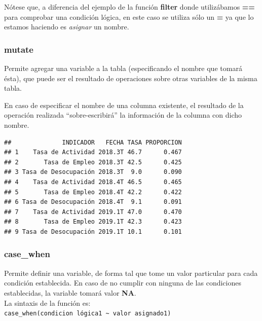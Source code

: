 \documentclass[]{book}
\newenvironment{Shaded}{\begin{snugshade}}{\end{snugshade}}
\newcommand{\DataTypeTok}[1]{\textcolor[rgb]{0.13,0.29,0.53}{#1}}
\newcommand{\DecValTok}[1]{\textcolor[rgb]{0.00,0.00,0.81}{#1}}
\newcommand{\KeywordTok}[1]{\textcolor[rgb]{0.13,0.29,0.53}{\textbf{#1}}}
\newcommand{\NormalTok}[1]{#1}
\newcommand{\OperatorTok}[1]{\textcolor[rgb]{0.81,0.36,0.00}{\textbf{#1}}}
\newcommand{\StringTok}[1]{\textcolor[rgb]{0.31,0.60,0.02}{#1}}
\begin{document}
Nótese que, a diferencia del ejemplo de la función \textbf{filter} donde utilizábamos \textbf{==} para comprobar una condición lógica, en este caso se utiliza sólo un \textbf{=} ya que lo estamos haciendo es \emph{asignar} un nombre.

\hypertarget{mutate}{%
\subsubsection{mutate}\label{mutate}}

Permite agregar una variable a la tabla (especificando el nombre que tomará ésta), que puede ser el resultado de operaciones sobre otras variables de la misma tabla.

En caso de especificar el nombre de una columna existente, el resultado de la operación realizada ``sobre-escribirá'' la información de la columna con dicho nombre.

\begin{Shaded}
\end{Shaded}

\begin{verbatim}
##              INDICADOR   FECHA TASA PROPORCION
## 1    Tasa de Actividad 2018.3T 46.7      0.467
## 2       Tasa de Empleo 2018.3T 42.5      0.425
## 3 Tasa de Desocupación 2018.3T  9.0      0.090
## 4    Tasa de Actividad 2018.4T 46.5      0.465
## 5       Tasa de Empleo 2018.4T 42.2      0.422
## 6 Tasa de Desocupación 2018.4T  9.1      0.091
## 7    Tasa de Actividad 2019.1T 47.0      0.470
## 8       Tasa de Empleo 2019.1T 42.3      0.423
## 9 Tasa de Desocupación 2019.1T 10.1      0.101
\end{verbatim}

\hypertarget{case_when}{%
\subsubsection{case\_when}\label{case_when}}

Permite definir una variable, de forma tal que tome un valor particular para cada condición establecida. En caso de no cumplir con ninguna de las condiciones establecidas, la variable tomará valor \textbf{NA}.\\
La sintaxis de la función es:\\
\texttt{case\_when(condicion\ lógica1\ \textasciitilde{}\ valor\ asignado1)}
\end{document}
